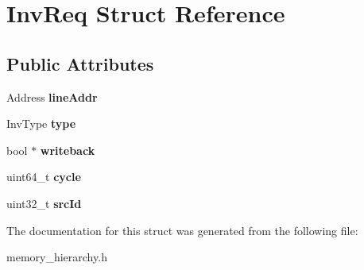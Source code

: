\hypertarget{structInvReq}{\section{Inv\-Req Struct Reference}
\label{structInvReq}
}
\subsection*{Public Attributes}
\begin{DoxyCompactItemize}
\item 
\hypertarget{structInvReq_a9f16132ca5dca960af111cbd1ced6502}{Address {\bfseries line\-Addr}}\label{structInvReq_a9f16132ca5dca960af111cbd1ced6502}

\item 
\hypertarget{structInvReq_aeec3fc9e09f02a2d7a1d9de9175e896d}{Inv\-Type {\bfseries type}}\label{structInvReq_aeec3fc9e09f02a2d7a1d9de9175e896d}

\item 
\hypertarget{structInvReq_a0150a3f54e76155f99050c5dfca653c4}{bool $\ast$ {\bfseries writeback}}\label{structInvReq_a0150a3f54e76155f99050c5dfca653c4}

\item 
\hypertarget{structInvReq_a1dcac7e748b9f5ba7c170445af35785b}{uint64\-\_\-t {\bfseries cycle}}\label{structInvReq_a1dcac7e748b9f5ba7c170445af35785b}

\item 
\hypertarget{structInvReq_a6dc852c7c27e072be4916c5c88f3e190}{uint32\-\_\-t {\bfseries src\-Id}}\label{structInvReq_a6dc852c7c27e072be4916c5c88f3e190}

\end{DoxyCompactItemize}


The documentation for this struct was generated from the following file\-:\begin{DoxyCompactItemize}
\item 
memory\-\_\-hierarchy.\-h\end{DoxyCompactItemize}
